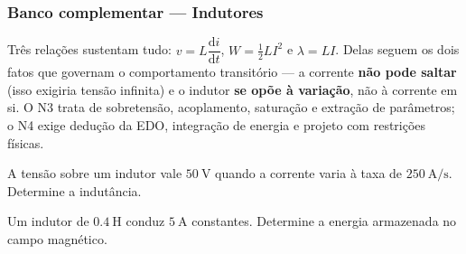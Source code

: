 
\subsubsection*{Banco complementar --- Indutores}

\begin{atencao}
Três relações sustentam tudo: $v=L\dfrac{\mathrm{d}i}{\mathrm{d}t}$,
$W=\frac12LI^{2}$ e $\lambda=LI$. Delas seguem os dois fatos que governam o
comportamento transitório --- a corrente \textbf{não pode saltar} (isso exigiria
tensão infinita) e o indutor \textbf{se opõe à variação}, não à corrente em si.
O N3 trata de sobretensão, acoplamento, saturação e extração de parâmetros; o
N4 exige dedução da EDO, integração de energia e projeto com restrições
físicas.
\end{atencao}

\blocofixacao

\begin{questao}[1]{}
A tensão sobre um indutor vale $\SI{50}{\volt}$ quando a corrente varia à taxa
de $\SI{250}{\ampere\per\second}$. Determine a indutância.
\end{questao}

\begin{questao}[1]{}
Um indutor de $\SI{0.4}{\henry}$ conduz $\SI{5}{\ampere}$ constantes. Determine
a energia armazenada no campo magnético.
\end{questao}

